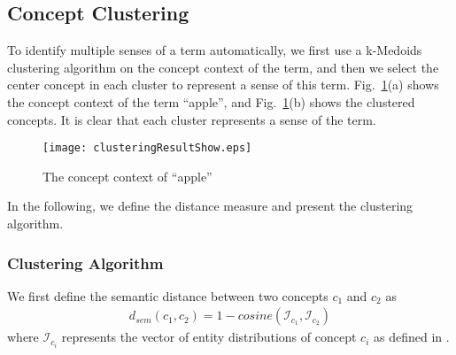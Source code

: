 \subsection{Concept Clustering}
To identify multiple senses of a term automatically, we first use a
k-Medoids clustering algorithm on the concept context of the term, and
then we select the center concept in each cluster to represent a sense
of this term.  Fig.~\ref{fig:clustersOfApp}(a) shows the concept
context of the term ``apple'', and Fig.~\ref{fig:clustersOfApp}(b)
shows the clustered concepts. It is clear that each cluster represents
a sense of the term.

\begin{figure}[!h]
 \centering
 \texttt{[image: clusteringResultShow.eps]}
 \caption{The concept context of ``apple''}
 \label{fig:clustersOfApp}
\end{figure}

In the following, we define the distance measure and present the
clustering algorithm.



\subsubsection{Clustering Algorithm}
We first define the semantic distance between two concepts $c_1$ and
$c_2$ as
\begin{equation}
\label{eq:semanticDist}
\begin{aligned}
d_{sem}(c_{1}, c_{2}) = 1-cosine(\mathcal{I}_{c_{1}}, \mathcal{I}_{c_{2}})
\end{aligned}
\end{equation}
where $\mathcal{I}_{c_i}$ represents the vector of entity distributions
of concept $c_i$ as defined in .

